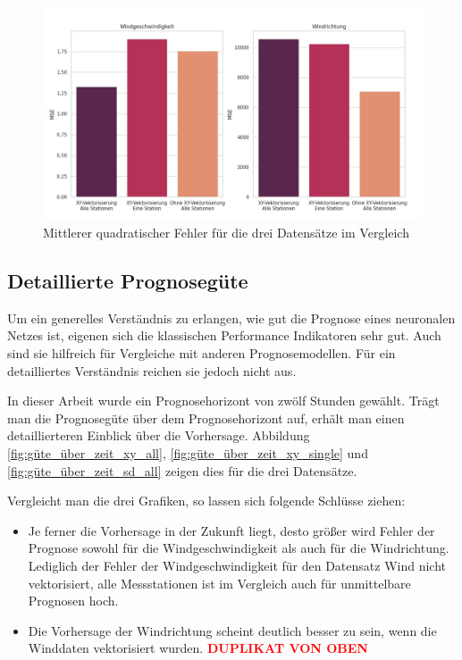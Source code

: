 \documentclass[
12pt, %
toc=listofnumbered, %
toc=chapterentrydotfill, %
numbers=noenddot, %
captions=tableheading, %
bibliography=numbered
]{scrreprt}
\let\Oldsubsection\subsection
\renewcommand{\subsection}{\FloatBarrier\Oldsubsection}
\newcommand{\qm}[1]{\glqq#1\grqq{}} %
\newcommand{\highlight}[1]{\textbf{\textcolor{red}{#1}}}
\begin{document}
\begin{figure}[tph]
	\begin{center}
		\includegraphics[width=\linewidth]{./images/barplot_mse-cropped.jpg}
		\caption{Mittlerer quadratischer Fehler für die drei Datensätze im Vergleich}
		\label{fig:barplot_mse}
	\end{center}
\end{figure}

\subsection{Detaillierte Prognosegüte}
Um ein generelles Verständnis zu erlangen, wie gut die Prognose eines neuronalen Netzes ist, eigenen sich die klassischen Performance Indikatoren sehr gut. Auch sind sie hilfreich für Vergleiche mit anderen Prognosemodellen. 
Für ein detailliertes Verständnis reichen sie jedoch nicht aus. 

In dieser Arbeit wurde ein Prognosehorizont von zwölf Stunden gewählt. Trägt man die Prognosegüte über dem Prognosehorizont auf, erhält man einen detaillierteren Einblick über die Vorhersage. Abbildung \ref{fig:güte_über_zeit_xy_all},  \ref{fig:güte_über_zeit_xy_single} und  \ref{fig:güte_über_zeit_sd_all} zeigen dies für die drei Datensätze.

Vergleicht man die drei Grafiken, so lassen sich folgende Schlüsse ziehen:

\begin{itemize}
	\item Je ferner die Vorhersage in der Zukunft liegt, desto größer wird Fehler der Prognose sowohl für die Windgeschwindigkeit als auch für die Windrichtung. Lediglich der Fehler der Windgeschwindigkeit für den Datensatz \qm{Wind nicht vektorisiert, alle Messstationen} ist im Vergleich auch für unmittelbare Prognosen hoch.
	\item Die Vorhersage der Windrichtung scheint deutlich besser zu sein, wenn die Winddaten vektorisiert wurden. \highlight{DUPLIKAT VON OBEN}
\end{itemize}
\end{document}
